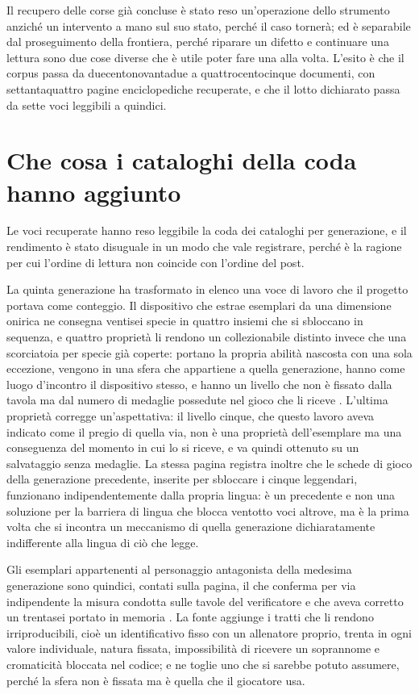 Il recupero delle corse già concluse è stato reso un'operazione dello strumento anziché un intervento a mano sul suo stato, perché il caso tornerà; ed è separabile dal proseguimento della frontiera, perché riparare un difetto e continuare una lettura sono due cose diverse che è utile poter fare una alla volta. L'esito è che il corpus passa da duecentonovantadue a quattrocentocinque documenti, con settantaquattro pagine enciclopediche recuperate, e che il lotto dichiarato passa da sette voci leggibili a quindici.

\section{Che cosa i cataloghi della coda hanno aggiunto}

Le voci recuperate hanno reso leggibile la coda dei cataloghi per generazione, e il rendimento è stato disuguale in un modo che vale registrare, perché è la ragione per cui l'ordine di lettura non coincide con l'ordine del post.

La quinta generazione ha trasformato in elenco una voce di lavoro che il progetto portava come conteggio. Il dispositivo che estrae esemplari da una dimensione onirica ne consegna ventisei specie in quattro insiemi che si sbloccano in sequenza, e quattro proprietà li rendono un collezionabile distinto invece che una scorciatoia per specie già coperte: portano la propria abilità nascosta con una sola eccezione, vengono in una sfera che appartiene a quella generazione, hanno come luogo d'incontro il dispositivo stesso, e hanno un livello che non è fissato dalla tavola ma dal numero di medaglie possedute nel gioco che li riceve \cite{bulbapedia-dream-radar}. L'ultima proprietà corregge un'aspettativa: il livello cinque, che questo lavoro aveva indicato come il pregio di quella via, non è una proprietà dell'esemplare ma una conseguenza del momento in cui lo si riceve, e va quindi ottenuto su un salvataggio senza medaglie. La stessa pagina registra inoltre che le schede di gioco della generazione precedente, inserite per sbloccare i cinque leggendari, funzionano indipendentemente dalla propria lingua: è un precedente e non una soluzione per la barriera di lingua che blocca ventotto voci altrove, ma è la prima volta che si incontra un meccanismo di quella generazione dichiaratamente indifferente alla lingua di ciò che legge.

Gli esemplari appartenenti al personaggio antagonista della medesima generazione sono quindici, contati sulla pagina, il che conferma per via indipendente la misura condotta sulle tavole del verificatore e che aveva corretto un trentasei portato in memoria \cite{bulbapedia-n-pokemon}. La fonte aggiunge i tratti che li rendono irriproducibili, cioè un identificativo fisso con un allenatore proprio, trenta in ogni valore individuale, natura fissata, impossibilità di ricevere un soprannome e cromaticità bloccata nel codice; e ne toglie uno che si sarebbe potuto assumere, perché la sfera non è fissata ma è quella che il giocatore usa.

